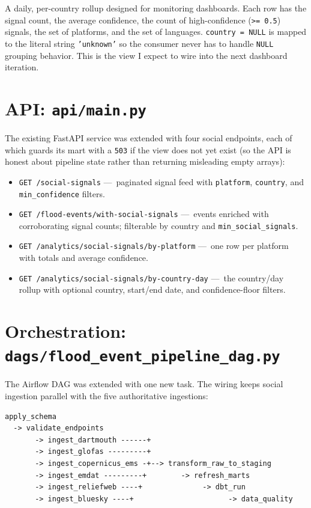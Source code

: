 \documentclass[11pt]{article}
\begin{document}
A daily, per-country rollup designed for monitoring dashboards. Each
row has the signal count, the average confidence, the count of
high-confidence (\texttt{>= 0.5}) signals, the set of platforms, and
the set of languages. \texttt{country = NULL} is mapped to the literal
string \texttt{'unknown'} so the consumer never has to handle
\texttt{NULL} grouping behavior. This is the view I expect to wire
into the next dashboard iteration.

\section{API: \texttt{api/main.py}}

The existing FastAPI service was extended with four social endpoints,
each of which guards its mart with a \texttt{503} if the view does not
yet exist (so the API is honest about pipeline state rather than
returning misleading empty arrays):

\begin{itemize}[leftmargin=*]
  \item \texttt{GET /social-signals} ---~paginated signal feed with
        \texttt{platform}, \texttt{country}, and
        \texttt{min\_confidence} filters.
  \item \texttt{GET /flood-events/with-social-signals} ---~events
        enriched with corroborating signal counts; filterable by
        country and \texttt{min\_social\_signals}.
  \item \texttt{GET /analytics/social-signals/by-platform} ---~one row
        per platform with totals and average confidence.
  \item \texttt{GET /analytics/social-signals/by-country-day} ---~the
        country/day rollup with optional country, start/end date, and
        confidence-floor filters.
\end{itemize}

\section{Orchestration: \texttt{dags/flood\_event\_pipeline\_dag.py}}

The Airflow DAG was extended with one new task. The wiring keeps
social ingestion parallel with the five authoritative ingestions:

\begin{lstlisting}
apply_schema
  -> validate_endpoints
       -> ingest_dartmouth ------+
       -> ingest_glofas ---------+
       -> ingest_copernicus_ems -+--> transform_raw_to_staging
       -> ingest_emdat ---------+        -> refresh_marts
       -> ingest_reliefweb ----+              -> dbt_run
       -> ingest_bluesky ----+                      -> data_quality
\end{lstlisting}
\end{document}

